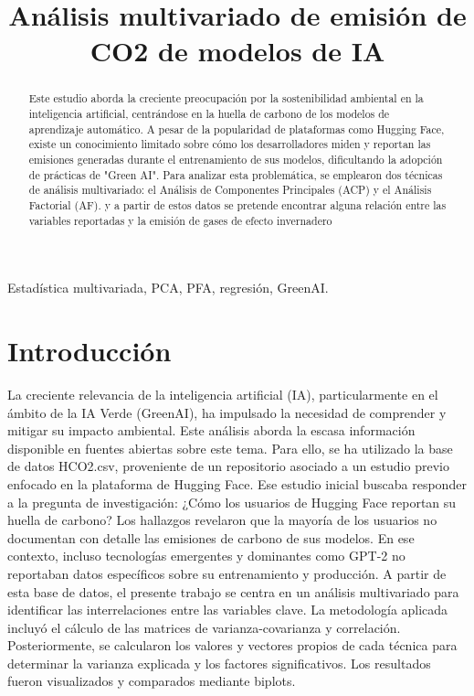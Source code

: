 \documentclass[journal]{IEEEtran}
\title{Análisis multivariado de emisión de CO2 de modelos de IA}
\author{
	\IEEEauthorblockN{Juan Felipe Gallo Rendón\IEEEauthorrefmark{1}}
	\IEEEauthorblockA{\textit{Facultad de Ingeniería} \\
		\textit{Universidad de Antioquia}\\
		Medellín, Colombia}
}
\begin{document}
	\maketitle

	\begin{abstract}
		Este estudio aborda la creciente preocupación por la sostenibilidad ambiental en la inteligencia artificial, centrándose en la huella de carbono de los modelos de aprendizaje automático. A pesar de la popularidad de plataformas como Hugging Face, existe un conocimiento limitado sobre cómo los desarrolladores miden y reportan las emisiones generadas durante el entrenamiento de sus modelos, dificultando la adopción de prácticas de "Green AI". Para analizar esta problemática, se emplearon dos técnicas de análisis multivariado: el Análisis de Componentes Principales (ACP) y el Análisis Factorial (AF). y a  partir de estos datos se pretende encontrar alguna relación entre las variables reportadas y la emisión de gases de efecto invernadero
	\end{abstract}

	\begin{IEEEkeywords}
		Estadística multivariada, PCA, PFA, regresión, GreenAI.
	\end{IEEEkeywords}


	\section{Introducción}
	\label{sec:introduction}
	La creciente relevancia de la inteligencia artificial (IA), particularmente en el ámbito de la IA Verde (GreenAI)\cite{green_ai_ust}, ha impulsado la necesidad de comprender y mitigar su impacto ambiental. Este análisis aborda la escasa información disponible en fuentes abiertas sobre este tema. Para ello, se ha utilizado la base de datos HCO2.csv, proveniente de un repositorio asociado a un estudio previo enfocado en la plataforma de Hugging Face\cite{exploring_carbon_footprint}. Ese estudio inicial buscaba responder a la pregunta de investigación: ¿Cómo los usuarios de Hugging Face reportan su huella de carbono? Los hallazgos revelaron que la mayoría de los usuarios no documentan con detalle las emisiones de carbono de sus modelos. En ese contexto, incluso tecnologías emergentes y dominantes como GPT-2 no reportaban datos específicos sobre su entrenamiento y producción.
	A partir de esta base de datos, el presente trabajo se centra en un análisis multivariado para identificar las interrelaciones entre las variables clave. La metodología aplicada incluyó el cálculo de las matrices de varianza-covarianza y correlación. Posteriormente, se calcularon los valores y vectores propios de cada técnica para determinar la varianza explicada y los factores significativos. Los resultados fueron visualizados y comparados mediante biplots.
\end{document}
